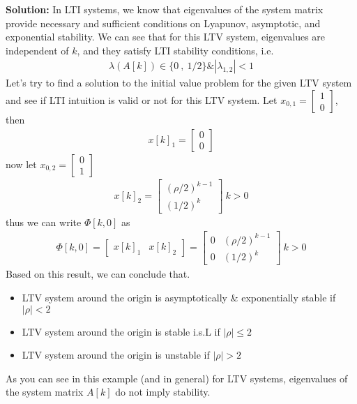 \documentclass[twoside]{article}
\begin{document}
\textbf{Solution:} In LTI systems, we know that eigenvalues of the system matrix provide necessary and sufficient conditions on
Lyapunov, asymptotic, and exponential stability. We can see that for this LTV system, eigenvalues are independent of $k$, and
they satisfy LTI stability conditions, i.e.
%
\begin{align*}
  \lambda(A[k]) \in \lbrace 0 \ , \ 1/2 \rbrace \& | \lambda_{1,2} | < 1
\end{align*}
%
Let's try to find a solution to the initial value problem for the given LTV system and see if LTI intuition is valid or not for this LTV system. Let $x_{0,1} = \begin{bmatrix} 1 \\ 0 \end{bmatrix}$, then
%
\begin{align*}
   x[k]_1 = \begin{bmatrix} 0 \\ 0 \end{bmatrix}
\end{align*}
%
now let $x_{0,2} = \begin{bmatrix} 0 \\ 1 \end{bmatrix}$
%
%
\begin{align*}
   x[k]_2 = \begin{bmatrix} (\rho/2)^{k-1} \\ (1/2)^k \end{bmatrix} \ k>0
\end{align*}
%
thus we can write $\Phi[k,0]$ as
%
\begin{align*}
   \Phi[k,0] = \begin{bmatrix} x[k]_1 & x[k]_2 \end{bmatrix} = 
   \begin{bmatrix} 0 & (\rho/2)^{k-1} \\ 0 & (1/2)^{k} \end{bmatrix} \ k > 0 
\end{align*}
%
Based on this result, we can conclude that.
%
\begin{itemize}
    \item LTV system around the origin is asymptotically \& exponentially stable if $|\rho| < 2$
    \item LTV system around the origin is stable i.s.L if $|\rho| \leq 2$
    \item LTV system around the origin is unstable if $|\rho| > 2$
\end{itemize}
%
As you can see in this example (and in general) for LTV systems, eigenvalues of the system matrix $A[k]$ do not imply stability.
\end{document}
